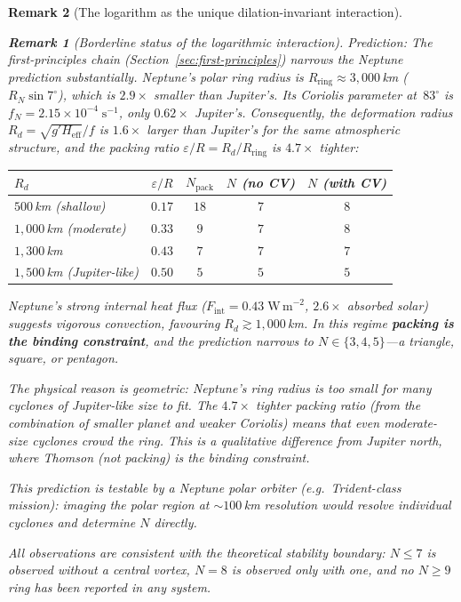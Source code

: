 \documentclass[12pt, a4paper]{article}
\newtheorem{remark}{Remark}[section]
\numberwithin{equation}{section}
\begin{document}
\begin{remark}[The logarithm as the unique dilation-invariant interaction]
\begin{remark}[Borderline status of the logarithmic interaction]
\textit{Prediction:}
The first-principles chain (Section~\ref{sec:first-principles})
narrows the Neptune prediction substantially.  Neptune's polar
ring radius is $R_{\mathrm{ring}} \approx 3{,}000$\,km
($R_N \sin 7^\circ$), which is $2.9\times$ smaller than Jupiter's.
Its Coriolis parameter at~$83^\circ$ is $f_N = 2.15\times
10^{-4}\;\mathrm{s}^{-1}$, only $0.62\times$ Jupiter's.
Consequently, the deformation radius
$R_d = \sqrt{g' H_{\mathrm{eff}}}/f$ is $1.6\times$ larger than
Jupiter's for the same atmospheric structure, and the packing ratio
$\varepsilon/R = R_d/R_{\mathrm{ring}}$ is $4.7\times$ tighter:
\begin{center}
\begin{tabular}{lcccc}
\toprule
$R_d$ & $\varepsilon/R$ & $N_{\mathrm{pack}}$ &
$N$ (no CV) & $N$ (with CV) \\
\midrule
$500$\,km (shallow) & $0.17$ & $18$ & $7$ & $8$ \\
$1{,}000$\,km (moderate) & $0.33$ & $9$ & $7$ & $8$ \\
$1{,}300$\,km & $0.43$ & $7$ & $7$ & $7$ \\
$1{,}500$\,km (Jupiter-like) & $0.50$ & $5$ & $5$ & $5$ \\
\bottomrule
\end{tabular}
\end{center}
Neptune's strong internal heat flux ($F_{\mathrm{int}} = 0.43\;
\mathrm{W\,m}^{-2}$, $2.6\times$ absorbed solar) suggests vigorous
convection, favouring $R_d \gtrsim 1{,}000$\,km.  In this regime
\textbf{packing is the binding constraint}, and the prediction
narrows to $N \in \{3, 4, 5\}$---a triangle, square, or pentagon.

The physical reason is geometric: Neptune's ring radius is too small
for many cyclones of Jupiter-like size to fit.  The $4.7\times$
tighter packing ratio (from the combination of smaller planet and
weaker Coriolis) means that even moderate-size cyclones crowd the
ring.  This is a qualitative difference from Jupiter north, where
Thomson (not packing) is the binding constraint.

This prediction is testable by a Neptune polar orbiter (e.g.\
Trident-class mission): imaging the polar region at
$\sim\!100$\,km resolution would resolve individual cyclones and
determine $N$ directly.

All observations are consistent with the theoretical stability
boundary: $N \le 7$ is observed without a central vortex, $N = 8$
is observed only with one, and no $N \ge 9$ ring has been reported
in any system.



\end{remark}
\end{remark}
\end{document}
